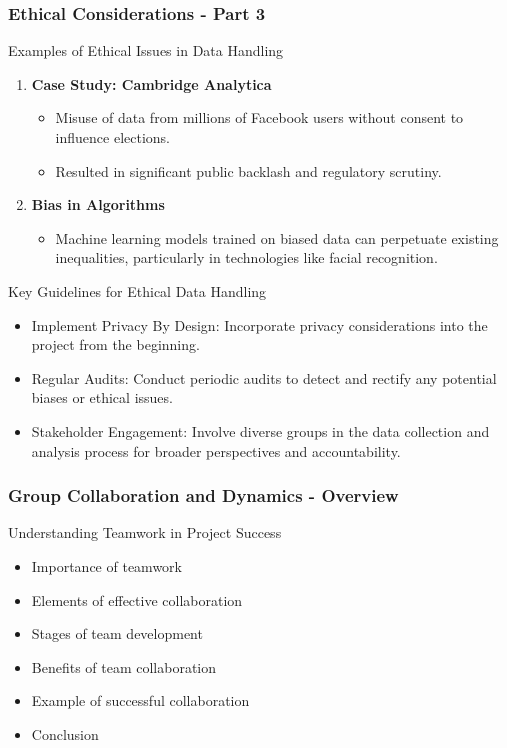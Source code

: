 \documentclass[aspectratio=169]{beamer}
\begin{document}
\begin{frame}[fragile]
    \frametitle{Ethical Considerations - Part 3}
    \begin{block}{Examples of Ethical Issues in Data Handling}
        \begin{enumerate}
            \item \textbf{Case Study: Cambridge Analytica}
                \begin{itemize}
                    \item Misuse of data from millions of Facebook users without consent to influence elections.
                    \item Resulted in significant public backlash and regulatory scrutiny.
                \end{itemize}
            \item \textbf{Bias in Algorithms}
                \begin{itemize}
                    \item Machine learning models trained on biased data can perpetuate existing inequalities, particularly in technologies like facial recognition.
                \end{itemize}
        \end{enumerate}
    \end{block}

    \begin{block}{Key Guidelines for Ethical Data Handling}
        \begin{itemize}
            \item Implement Privacy By Design: Incorporate privacy considerations into the project from the beginning.
            \item Regular Audits: Conduct periodic audits to detect and rectify any potential biases or ethical issues.
            \item Stakeholder Engagement: Involve diverse groups in the data collection and analysis process for broader perspectives and accountability.
        \end{itemize}
    \end{block}
\end{frame}

\begin{frame}[fragile]
  \frametitle{Group Collaboration and Dynamics - Overview}
  \begin{block}{Understanding Teamwork in Project Success}
    \begin{itemize}
      \item Importance of teamwork
      \item Elements of effective collaboration
      \item Stages of team development
      \item Benefits of team collaboration
      \item Example of successful collaboration
      \item Conclusion
    \end{itemize}
  \end{block}
\end{frame}
\end{document}
